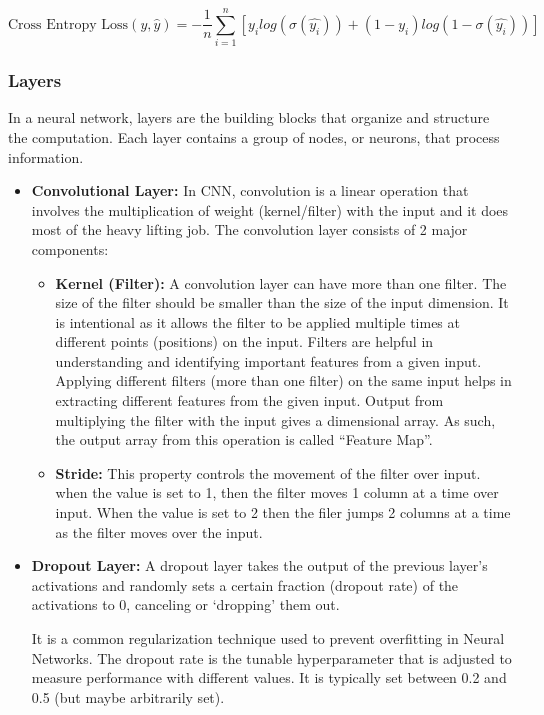\begin{itemize}
\begin{itemize}
         \[
         \text{Cross Entropy Loss}(y,\hat{y})=-\frac{1}{n}\sum_{i=1}^{n}[y_{i}log(\sigma(\hat{y_{i}}))+(1-y_{i})log(1-\sigma(\hat{y_{i}}))]
         \]
      \end{itemize}

\end{itemize}

\subsubsection{Layers}
In a neural network, layers are the building blocks that organize and structure the computation. Each layer contains a group of nodes, or neurons, that process information.
\begin{itemize}
    \item \textbf{Convolutional Layer: } In CNN, convolution is a linear operation that involves the multiplication of weight (kernel/filter) with the input and it does most of the heavy lifting job. The convolution layer consists of 2 major components: \\
    \begin{itemize}
        \item \textbf{Kernel (Filter): } A convolution layer can have more than one filter. The size of the filter should be smaller than the size of the input dimension. It is intentional as it allows the filter to be applied multiple times at different points (positions) on the input. Filters are helpful in understanding and identifying important features from a given input. Applying different filters (more than one filter) on the same input helps in extracting different features from the given input. Output from multiplying the filter with the input gives a dimensional array. As such, the output array from this operation is called “Feature Map”.
        \item \textbf{Stride: } This property controls the movement of the filter over input. when the value is set to 1, then the filter moves 1 column at a time over input. When the value is set to 2 then the filer jumps 2 columns at a time as the filter moves over the input.
    \end{itemize}
    \item \textbf{Dropout Layer: } A dropout layer takes the output of the previous layer’s activations and randomly sets a certain fraction (dropout rate) of the activations to 0, canceling or ‘dropping’ them out.

    It is a common regularization technique used to prevent overfitting in Neural Networks.
    The dropout rate is the tunable hyperparameter that is adjusted to measure performance with different values. It is typically set between 0.2 and 0.5 (but maybe arbitrarily set).
    

\end{itemize}
